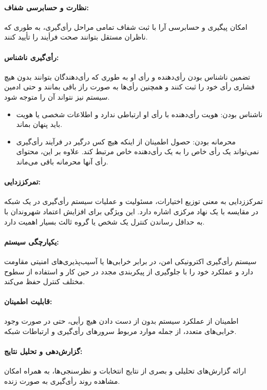 \documentclass[12pt]{article}
\begin{document}
\paragraph{نظارت و حسابرسی شفاف:}
امکان پیگیری و حسابرسی آرا با ثبت شفاف تمامی مراحل رأی‌گیری، به طوری که ناظران مستقل بتوانند صحت فرأیند را تأیید کنند.

\paragraph{رأی‌گیری ناشناس:}
تضمین ناشناس بودن%
رأی‌دهنده و رأی او  به طوری که رأی‌دهندگان بتوانند بدون هیچ فشاری رأی خود را ثبت کنند و همچنین رأی‌ها به صورت راز باقی بمانند و حتی ادمین سیستم نیز نتواند آن را متوجه شود.
\begin{itemize}
\item
ناشناس بودن: هویت رأی‌دهنده با رأی او ارتباطی ندارد و اطلاعات شخصی یا هویت باید پنهان بماند.
\item
محرمانه بودن: حصول اطمینان از اینکه هیچ کس درگیر در فرآیند رأی‌گیری نمی‌تواند یک رأی خاص را به یک رأی‌دهنده خاص مرتبط کند. علاوه بر این، محتوای رأی آنها محرمانه باقی می‌ماند.
\end{itemize}


\paragraph{تمرکززدایی:}
تمرکززدایی به معنی توزیع اختیارات، مسئولیت و عملیات سیستم رأی‌گیری در یک شبکه در مقایسه با یک نهاد مرکزی اشاره دارد. این ویژگی برای افزایش اعتماد شهروندان با به حداقل رساندن کنترل یک شخص یا گروه ثالث بسیار اهمیت دارد.

\paragraph[یکپارچگی سیستم]{یکپارچگی سیستم:}
سیستم رأی‌گیری اکترونیکی امن، در برابر خرابی‌ها یا آسیب‌پذیری‌های امنیتی مقاومت دارد و عملکرد خود را با جلوگیری از پیکربندی مجدد در حین کار و استفاده از سطوح مختلف کنترل حفظ می‌کند.

\paragraph[قابلیت اطمینان]{قابلیت اطمینان:}
اطمینان از عملکرد سیستم بدون از دست دادن هیچ رأیی، حتی در صورت وجود خرابی‌های متعدد، از جمله موارد مربوط سرورهای رأی‌گیری و ارتباطات شبکه. 

\paragraph{گزارش‌دهی و تحلیل نتایج:}
ارائه گزارش‌های تحلیلی و بصری از نتایج انتخابات و نظرسنجی‌ها، به همراه امکان مشاهده روند رأی‌گیری به صورت زنده.
\end{document}
